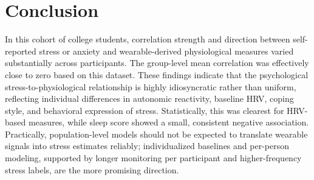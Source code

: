 \documentclass[11pt, a4paper, oneside]{article}
\begin{document}
\section{Conclusion}
In this cohort of college students, correlation strength and direction between self-reported stress or anxiety and wearable-derived physiological measures varied substantially across participants. The group-level mean correlation was effectively close to zero based on this dataset. These findings indicate that the psychological stress-to-physiological relationship is highly idiosyncratic rather than uniform, reflecting individual differences in autonomic reactivity, baseline HRV, coping style, and behavioral expression of stress. Statistically, this was clearest for HRV-based measures, while sleep score showed a small, consistent negative association. Practically, population-level models should not be expected to translate wearable signals into stress estimates reliably; individualized baselines and per-person modeling, supported by longer monitoring per participant and higher-frequency stress labels, are the more promising direction.
\end{document}

